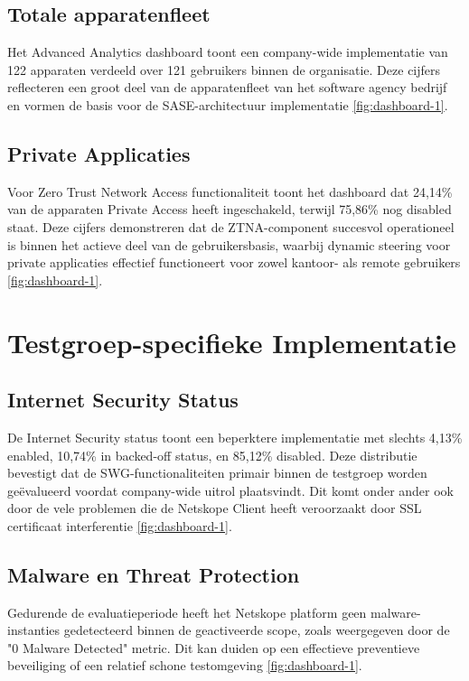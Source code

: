 \subsection{Totale apparatenfleet}
Het Advanced Analytics dashboard toont een company-wide implementatie van 122 apparaten verdeeld over 121 gebruikers binnen de organisatie. Deze cijfers reflecteren een groot deel van de apparatenfleet van het software agency bedrijf en vormen de basis voor de SASE-architectuur implementatie \ref{fig:dashboard-1}.

\subsection{Private Applicaties}
Voor Zero Trust Network Access functionaliteit toont het dashboard dat 24,14\% van de apparaten Private Access heeft ingeschakeld, terwijl 75,86\% nog disabled staat. Deze cijfers demonstreren dat de ZTNA-component succesvol operationeel is binnen het actieve deel van de gebruikersbasis, waarbij dynamic steering voor private applicaties effectief functioneert voor zowel kantoor- als remote gebruikers \ref{fig:dashboard-1}.

\section{Testgroep-specifieke Implementatie}
\subsection{Internet Security Status}
De Internet Security status toont een beperktere implementatie met slechts 4,13\% enabled, 10,74\% in backed-off status, en 85,12\% disabled. Deze distributie bevestigt dat de SWG-functionaliteiten primair binnen de testgroep worden geëvalueerd voordat company-wide uitrol plaatsvindt. Dit komt onder ander ook door de vele problemen die de Netskope Client heeft veroorzaakt door SSL certificaat interferentie \ref{fig:dashboard-1}.

\subsection{Malware en Threat Protection}
Gedurende de evaluatieperiode heeft het Netskope platform geen malware-instanties gedetecteerd binnen de geactiveerde scope, zoals weergegeven door de "0 Malware Detected" metric. Dit kan duiden op een effectieve preventieve beveiliging of een relatief schone testomgeving \ref{fig:dashboard-1}.

